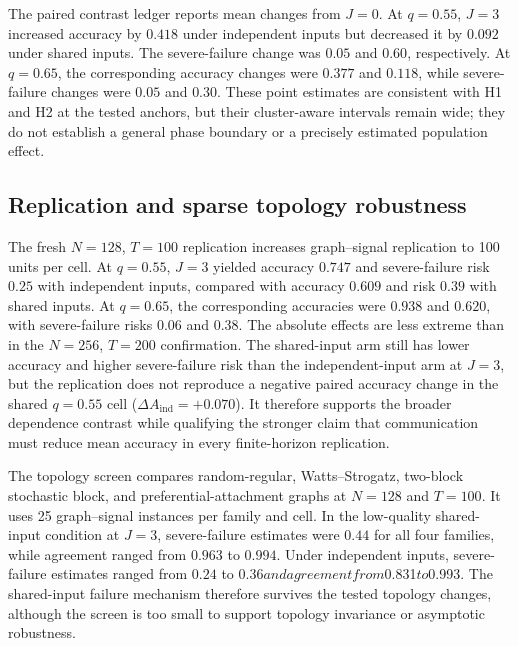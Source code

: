 \documentclass[11pt,a4paper]{article}
\begin{document}
The paired contrast ledger reports mean changes from $J=0$. At $q=0.55$, $J=3$ increased accuracy by $0.418$ under independent inputs but decreased it by $0.092$ under shared inputs. The severe-failure change was $0.05$ and $0.60$, respectively. At $q=0.65$, the corresponding accuracy changes were $0.377$ and $0.118$, while severe-failure changes were $0.05$ and $0.30$. These point estimates are consistent with H1 and H2 at the tested anchors, but their cluster-aware intervals remain wide; they do not establish a general phase boundary or a precisely estimated population effect.

\subsection{Replication and sparse topology robustness}

The fresh $N=128$, $T=100$ replication increases graph--signal replication to 100 units per cell. At $q=0.55$, $J=3$ yielded accuracy $0.747$ and severe-failure risk $0.25$ with independent inputs, compared with accuracy $0.609$ and risk $0.39$ with shared inputs. At $q=0.65$, the corresponding accuracies were $0.938$ and $0.620$, with severe-failure risks $0.06$ and $0.38$. The absolute effects are less extreme than in the $N=256$, $T=200$ confirmation. The shared-input arm still has lower accuracy and higher severe-failure risk than the independent-input arm at $J=3$, but the replication does not reproduce a negative paired accuracy change in the shared $q=0.55$ cell ($\Delta A_{\mathrm{ind}}=+0.070$). It therefore supports the broader dependence contrast while qualifying the stronger claim that communication must reduce mean accuracy in every finite-horizon replication.

The topology screen compares random-regular, Watts--Strogatz, two-block stochastic block, and preferential-attachment graphs at $N=128$ and $T=100$. It uses 25 graph--signal instances per family and cell. In the low-quality shared-input condition at $J=3$, severe-failure estimates were $0.44$ for all four families, while agreement ranged from $0.963$ to $0.994$. Under independent inputs, severe-failure estimates ranged from $0.24$ to $0.36 and agreement from $0.831$ to $0.993. The shared-input failure mechanism therefore survives the tested topology changes, although the screen is too small to support topology invariance or asymptotic robustness.
\end{document}
